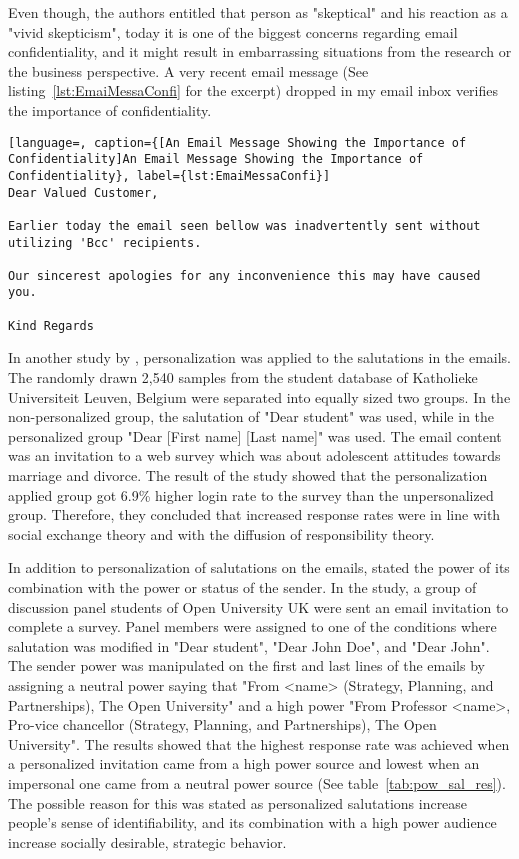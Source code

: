 Even though, the authors entitled that person as "skeptical" and his reaction as a "vivid skepticism", today it is one of the biggest concerns regarding email confidentiality, and it might result in embarrassing situations from the research or the business perspective. A very recent email message (See listing~\ref{lst:EmaiMessaConfi} for the excerpt) dropped in my email inbox verifies the importance of confidentiality.  
\vspace{1cm}

\begin{lstlisting}[language=, caption={[An Email Message Showing the Importance of Confidentiality]An Email Message Showing the Importance of Confidentiality}, label={lst:EmaiMessaConfi}]
Dear Valued Customer,

Earlier today the email seen bellow was inadvertently sent without utilizing 'Bcc' recipients.

Our sincerest apologies for any inconvenience this may have caused you.

Kind Regards
\end{lstlisting}

In another study by \cite{Heerwegh2005}, personalization was applied to the salutations in the emails. The randomly drawn 2,540 samples from the student database of Katholieke Universiteit Leuven, Belgium were separated into equally sized two groups. In the non-personalized group, the salutation of "Dear student" was used, while in the personalized group "Dear [First name] [Last name]" was used. The email content was an invitation to a web survey which was about adolescent attitudes towards marriage and divorce. The result of the study showed that the personalization applied group got 6.9\% higher login rate to the survey than the unpersonalized group. Therefore, they concluded that increased response rates were in line with social exchange theory and with the diffusion of responsibility theory.
\vspace{1cm}

In addition to personalization of salutations on the emails, \cite{Joinson2007} stated the power of its combination with the power or status of the sender. In the study, a group of discussion panel students of Open University UK were sent an email invitation to complete a survey. Panel members were assigned to one of the conditions where salutation was modified in "Dear student", "Dear John Doe", and "Dear John". The sender power was manipulated on the first and last lines of the emails by assigning a neutral power saying that "From <name> (Strategy, Planning, and Partnerships), The Open University" and a high power "From Professor <name>, Pro-vice chancellor (Strategy, Planning, and Partnerships), The Open University". The results showed that the highest response rate was achieved when a personalized invitation came from a high power source and lowest when an impersonal one came from a neutral power source (See table~\ref{tab:pow_sal_res}). The possible reason for this was stated as personalized salutations increase people's sense of identifiability,  and its combination with a high power audience increase socially desirable, strategic behavior.

